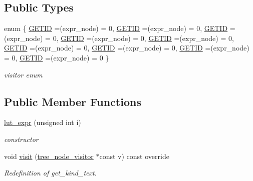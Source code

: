 \subsection*{Public Types}
\begin{DoxyCompactItemize}
\item 
enum \{ \newline
\hyperlink{structlut__expr_a86c4d55edc408fd38d38262743e9a06dae6e445369ad3ce6dc57e133da2aff013}{G\+E\+T\+ID} =(expr\+\_\+node) = 0, 
\hyperlink{structlut__expr_a86c4d55edc408fd38d38262743e9a06dae6e445369ad3ce6dc57e133da2aff013}{G\+E\+T\+ID} =(expr\+\_\+node) = 0, 
\hyperlink{structlut__expr_a86c4d55edc408fd38d38262743e9a06dae6e445369ad3ce6dc57e133da2aff013}{G\+E\+T\+ID} =(expr\+\_\+node) = 0, 
\hyperlink{structlut__expr_a86c4d55edc408fd38d38262743e9a06dae6e445369ad3ce6dc57e133da2aff013}{G\+E\+T\+ID} =(expr\+\_\+node) = 0, 
\newline
\hyperlink{structlut__expr_a86c4d55edc408fd38d38262743e9a06dae6e445369ad3ce6dc57e133da2aff013}{G\+E\+T\+ID} =(expr\+\_\+node) = 0, 
\hyperlink{structlut__expr_a86c4d55edc408fd38d38262743e9a06dae6e445369ad3ce6dc57e133da2aff013}{G\+E\+T\+ID} =(expr\+\_\+node) = 0, 
\hyperlink{structlut__expr_a86c4d55edc408fd38d38262743e9a06dae6e445369ad3ce6dc57e133da2aff013}{G\+E\+T\+ID} =(expr\+\_\+node) = 0, 
\hyperlink{structlut__expr_a86c4d55edc408fd38d38262743e9a06dae6e445369ad3ce6dc57e133da2aff013}{G\+E\+T\+ID} =(expr\+\_\+node) = 0, 
\newline
\hyperlink{structlut__expr_a86c4d55edc408fd38d38262743e9a06dae6e445369ad3ce6dc57e133da2aff013}{G\+E\+T\+ID} =(expr\+\_\+node) = 0
 \}\begin{DoxyCompactList}\small\item\em visitor enum \end{DoxyCompactList}
\end{DoxyCompactItemize}
\subsection*{Public Member Functions}
\begin{DoxyCompactItemize}
\item 
\hyperlink{structlut__expr_a3824881ef7539118315c164a1397013c}{lut\+\_\+expr} (unsigned int i)
\begin{DoxyCompactList}\small\item\em constructor \end{DoxyCompactList}\item 
void \hyperlink{structlut__expr_a038fb8662e73256339281dac776155d0}{visit} (\hyperlink{classtree__node__visitor}{tree\+\_\+node\+\_\+visitor} $\ast$const v) const override
\begin{DoxyCompactList}\small\item\em Redefinition of get\+\_\+kind\+\_\+text. \end{DoxyCompactList}\end{DoxyCompactItemize}
